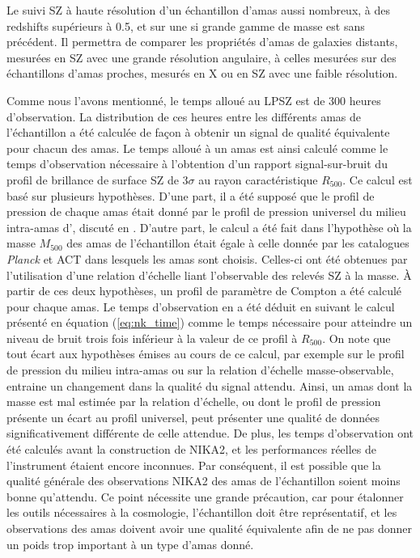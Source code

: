 Le suivi SZ à haute résolution d'un échantillon d'amas aussi nombreux, à des redshifts supérieurs à 0.5, et sur une si grande gamme de masse est sans précédent.
Il permettra de comparer les propriétés d'amas de galaxies distants, mesurées en SZ avec une grande résolution angulaire, à celles mesurées sur des échantillons d'amas proches, mesurés en X ou en SZ avec une faible résolution.

Comme nous l'avons mentionné, le temps alloué au LPSZ est de 300 heures d'observation.
La distribution de ces heures entre les différents amas de l'échantillon a été calculée de façon à obtenir un signal de qualité équivalente pour chacun des amas.
Le temps alloué à un amas est ainsi calculé comme le temps d'observation nécessaire à l'obtention d'un rapport signal-sur-bruit du profil de brillance de surface SZ de $3\sigma$ au rayon caractéristique $R_{500}$.
Ce calcul est basé sur plusieurs hypothèses.
D'une part, il a été supposé que le profil de pression de chaque amas était donné par le profil de pression universel du milieu intra-amas d', discuté en .
D'autre part, le calcul a été fait dans l'hypothèse où la masse $M_{500}$ des amas de l'échantillon était égale à celle donnée par les catalogues \textit{Planck} et ACT dans lesquels les amas sont choisis.
Celles-ci ont été obtenues par l'utilisation d'une relation d'échelle liant l'observable des relevés SZ à la masse.
À partir de ces deux hypothèses, un profil de paramètre de Compton a été calculé pour chaque amas.
Le temps d'observation en a été déduit en suivant le calcul présenté en équation (\ref{eq:nk_time}) comme le temps nécessaire pour atteindre un niveau de bruit trois fois inférieur à la valeur de ce profil à $R_{500}$.
On note que tout écart aux hypothèses émises au cours de ce calcul, par exemple sur le profil de pression du milieu intra-amas ou sur la relation d'échelle masse-observable, entraine un changement dans la qualité du signal attendu.
Ainsi, un amas dont la masse est mal estimée par la relation d'échelle, ou dont le profil de pression présente un écart au profil universel, peut présenter une qualité de données significativement différente de celle attendue.
De plus, les temps d'observation ont été calculés avant la construction de NIKA2, et les performances réelles de l'instrument étaient encore inconnues.
Par conséquent, il est possible que la qualité générale des observations NIKA2 des amas de l'échantillon soient moins bonne qu'attendu.
Ce point nécessite une grande précaution, car pour étalonner les outils nécessaires à la cosmologie, l'échantillon doit être représentatif, et les observations des amas doivent avoir une qualité équivalente afin de ne pas donner un poids trop important à un type d'amas donné.

